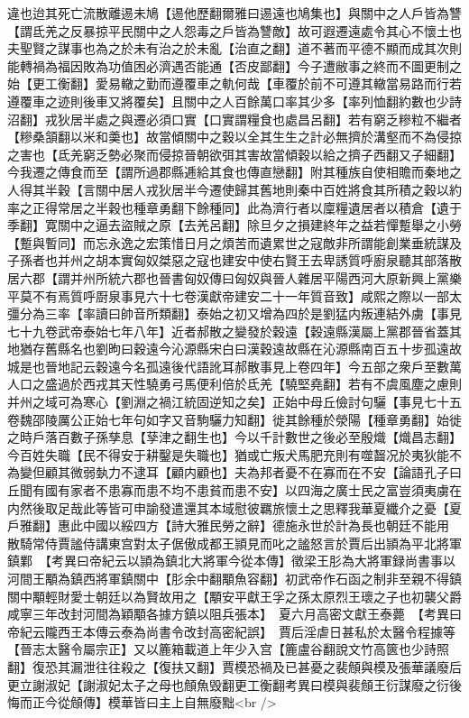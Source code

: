 違也迨其死亡流散離逷未鳩【逷他歷翻爾雅曰逷遠也鳩集也】與關中之人戶皆為讐【謂氐羌之反暴掠平民關中之人怨毒之戶皆為讐敵】故可遐遷遠處令其心不懷土也夫聖賢之謀事也為之於未有治之於未亂【治直之翻】道不著而平德不顯而成其次則能轉禍為福因敗為功值困必濟遇否能通【否皮鄙翻】今子遭敝事之終而不圖更制之始【更工衡翻】愛易轍之勤而遵覆車之軌何哉【車覆於前不可遵其轍當易路而行若遵覆車之迹則後車又將覆矣】且關中之人百餘萬口率其少多【率列恤翻約數也少詩沼翻】戎狄居半處之與遷必須口實【口實謂糧食也處昌呂翻】若有窮乏糝粒不繼者【糝桑頷翻以米和羮也】故當傾關中之穀以全其生生之計必無擠於溝壑而不為侵掠之害也【氐羌窮乏勢必聚而侵掠晉朝欲弭其害故當傾穀以給之擠子西翻又子細翻】今我遷之傳食而至【謂所過郡縣逓給其食也傳直戀翻】附其種族自使相贍而秦地之人得其半穀【言關中居人戎狄居半今遷使歸其舊地則秦中百姓將食其所積之穀以約率之正得常居之半穀也種章勇翻下餘種同】此為濟行者以廩糧遺居者以積倉【遺于季翻】寛關中之逼去盜賊之原【去羌呂翻】除旦夕之損建終年之益若憚蹔舉之小勞【蹔與暫同】而忘永逸之宏策惜日月之煩苦而遺累世之寇敵非所謂能創業垂統謀及子孫者也并州之胡本實匈奴桀惡之寇也建安中使右賢王去卑誘質呼廚泉聽其部落散居六郡【謂并州所統六郡也晉書匈奴傳曰匈奴與晉人雜居平陽西河大原新興上黨樂平莫不有焉質呼㕑泉事見六十七卷漢獻帝建安二十一年質音致】咸熙之際以一部太彊分為三率【率讀曰帥音所類翻】泰始之初又增為四於是劉猛内叛連結外虜【事見七十九卷武帝泰始七年八年】近者郝散之變發於穀遠【穀遠縣漢屬上黨郡晉省蓋其地猶存舊縣名也劉昫曰穀遠今沁源縣宋白曰漢穀遠故縣在沁源縣南百五十步孤遠故城是也晉地記云穀遠今名孤遠後代語訛耳郝散事見上卷四年】今五部之衆戶至數萬人口之盛過於西戎其天性驍勇弓馬便利倍於氐羌【驍堅堯翻】若有不虞風塵之慮則并州之域可為寒心【劉淵之禍江統固逆知之矣】正始中母丘儉討句驪【事見七十五卷魏邵陵厲公正始七年句如字又音駒驪力知翻】徙其餘種於滎陽【種章勇翻】始徙之時戶落百數子孫孳息【孶津之翻生也】今以千計數世之後必至殷熾【熾昌志翻】今百姓失職【民不得安于耕鑿是失職也】猶或亡叛犬馬肥充則有噬齧况於夷狄能不為變但顧其微弱埶力不逮耳【顧内顧也】夫為邦者憂不在寡而在不安【論語孔子曰丘聞有國有家者不患寡而患不均不患貧而患不安】以四海之廣士民之富豈須夷虜在内然後取足哉此等皆可申諭發遣還其本域慰彼羈旅懷土之思釋我華夏纖介之憂【夏戶雅翻】惠此中國以綏四方【詩大雅民勞之辭】德施永世於計為長也朝廷不能用　散騎常侍賈謐侍講東宫對太子倨傲成都王頴見而叱之謐怒言於賈后出頴為平北將軍鎮鄴　【考異曰帝紀云以頴為鎮北大將軍今從本傳】徵梁王肜為大將軍録尚書事以河間王顒為鎮西將軍鎮關中【肜余中翻顒魚容翻】初武帝作石函之制非至親不得鎮關中顒輕財愛士朝廷以為賢故用之【顒安平獻王孚之孫太原烈王瓌之子也初襲父爵咸寧三年改封河間為穎顒各據方鎮以阻兵張本】　夏六月高密文獻王泰薨　【考異曰帝紀云隴西王本傳云泰為尚書令改封高密紀誤】　賈后淫虐日甚私於太醫令程據等【晉志太醫令屬宗正】又以簏箱載道上年少入宫【簏盧谷翻說文竹高篋也少詩照翻】復恐其漏泄往往殺之【復扶又翻】賈模恐禍及已甚憂之裴頠與模及張華議廢后更立謝淑妃【謝淑妃太子之母也頠魚毁翻更工衡翻考異曰模與裴頠王衍謀廢之衍後悔而正今從頠傳】模華皆曰主上自無廢黜<br />

